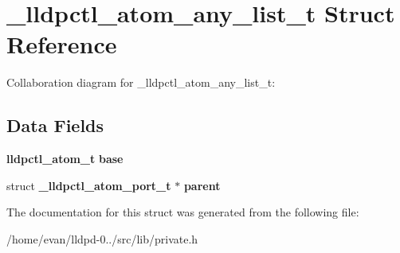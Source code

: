 \section{\-\_\-lldpctl\-\_\-atom\-\_\-any\-\_\-list\-\_\-t \-Struct \-Reference}
\label{struct__lldpctl__atom__any__list__t}


\-Collaboration diagram for \-\_\-lldpctl\-\_\-atom\-\_\-any\-\_\-list\-\_\-t\-:
\subsection*{\-Data \-Fields}
\begin{DoxyCompactItemize}
\item 
{\bf lldpctl\-\_\-atom\-\_\-t} {\bfseries base}\label{struct__lldpctl__atom__any__list__t_add397d02e5d3c1626944dc981febfa0f}

\item 
struct {\bf \-\_\-lldpctl\-\_\-atom\-\_\-port\-\_\-t} $\ast$ {\bfseries parent}\label{struct__lldpctl__atom__any__list__t_a6b11064aa792e72fda7db80104928434}

\end{DoxyCompactItemize}


\-The documentation for this struct was generated from the following file\-:\begin{DoxyCompactItemize}
\item 
/home/evan/lldpd-\/0../src/lib/private.\-h\end{DoxyCompactItemize}
